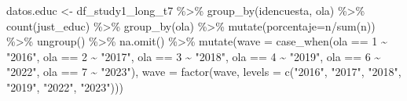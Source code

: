 \documentclass[
  12pt,
  letterpaper,
  DIV=11,
  numbers=noendperiod]{scrartcl}
\newenvironment{Shaded}{\begin{snugshade}}{\end{snugshade}}
\newcommand{\AttributeTok}[1]{\textcolor[rgb]{0.40,0.45,0.13}{#1}}
\newcommand{\DecValTok}[1]{\textcolor[rgb]{0.68,0.00,0.00}{#1}}
\newcommand{\FunctionTok}[1]{\textcolor[rgb]{0.28,0.35,0.67}{#1}}
\newcommand{\NormalTok}[1]{\textcolor[rgb]{0.00,0.23,0.31}{#1}}
\newcommand{\OtherTok}[1]{\textcolor[rgb]{0.00,0.23,0.31}{#1}}
\newcommand{\SpecialCharTok}[1]{\textcolor[rgb]{0.37,0.37,0.37}{#1}}
\newcommand{\StringTok}[1]{\textcolor[rgb]{0.13,0.47,0.30}{#1}}
\begin{document}
\begin{Shaded}
\begin{Highlighting}[]
\NormalTok{datos.educ }\OtherTok{\textless{}{-}}\NormalTok{ df\_study1\_long\_t7 }\SpecialCharTok{\%\textgreater{}\%} 
  \FunctionTok{group\_by}\NormalTok{(idencuesta, ola) }\SpecialCharTok{\%\textgreater{}\%} 
  \FunctionTok{count}\NormalTok{(just\_educ) }\SpecialCharTok{\%\textgreater{}\%} 
  \FunctionTok{group\_by}\NormalTok{(ola) }\SpecialCharTok{\%\textgreater{}\%} 
  \FunctionTok{mutate}\NormalTok{(}\AttributeTok{porcentaje=}\NormalTok{n}\SpecialCharTok{/}\FunctionTok{sum}\NormalTok{(n)) }\SpecialCharTok{\%\textgreater{}\%} 
  \FunctionTok{ungroup}\NormalTok{() }\SpecialCharTok{\%\textgreater{}\%} 
  \FunctionTok{na.omit}\NormalTok{() }\SpecialCharTok{\%\textgreater{}\%} 
  \FunctionTok{mutate}\NormalTok{(}\AttributeTok{wave =} \FunctionTok{case\_when}\NormalTok{(ola }\SpecialCharTok{==} \DecValTok{1} \SpecialCharTok{\textasciitilde{}} \StringTok{"2016"}\NormalTok{,}
\NormalTok{                          ola }\SpecialCharTok{==} \DecValTok{2} \SpecialCharTok{\textasciitilde{}} \StringTok{"2017"}\NormalTok{,}
\NormalTok{                          ola }\SpecialCharTok{==} \DecValTok{3} \SpecialCharTok{\textasciitilde{}} \StringTok{"2018"}\NormalTok{,}
\NormalTok{                          ola }\SpecialCharTok{==} \DecValTok{4} \SpecialCharTok{\textasciitilde{}} \StringTok{"2019"}\NormalTok{,}
\NormalTok{                          ola }\SpecialCharTok{==} \DecValTok{6} \SpecialCharTok{\textasciitilde{}} \StringTok{"2022"}\NormalTok{,}
\NormalTok{                          ola }\SpecialCharTok{==} \DecValTok{7} \SpecialCharTok{\textasciitilde{}} \StringTok{"2023"}\NormalTok{),}
         \AttributeTok{wave =} \FunctionTok{factor}\NormalTok{(wave, }\AttributeTok{levels =} \FunctionTok{c}\NormalTok{(}\StringTok{"2016"}\NormalTok{,}
                                        \StringTok{"2017"}\NormalTok{,}
                                        \StringTok{"2018"}\NormalTok{,}
                                        \StringTok{"2019"}\NormalTok{,}
                                        \StringTok{"2022"}\NormalTok{,}
                                        \StringTok{"2023"}\NormalTok{)))}




\end{Highlighting}
\end{Shaded}
\end{document}
